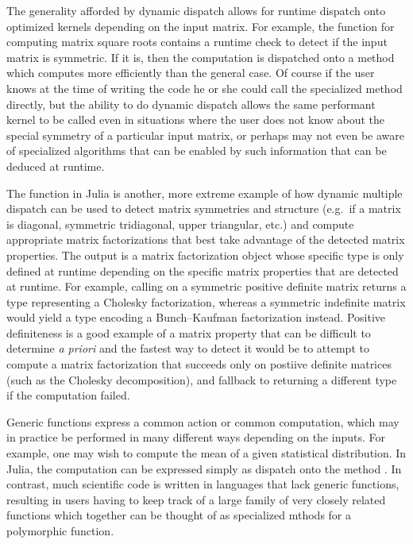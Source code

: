 The generality afforded by dynamic dispatch allows for runtime dispatch onto
optimized kernels depending on the input matrix. For example, the
 function for computing matrix square roots contains a
runtime check to detect if the input matrix is symmetric. If it is, then the
computation is dispatched onto a  method which
computes more efficiently than the general case. Of course if the user knows at
the time of writing the code he or she could call the specialized method
directly, but the ability to do dynamic dispatch allows the same performant
kernel to be called even in situations where the user does not know about the
special symmetry of a particular input matrix, or perhaps may not even be aware
of specialized algorithms that can be enabled by such information that can be
deduced at runtime.

The  function in Julia is another, more extreme example of how
dynamic multiple dispatch can be used to detect matrix symmetries and structure
(e.g.\ if a matrix is diagonal, symmetric tridiagonal, upper triangular, etc.)
and compute appropriate matrix factorizations that best take advantage of the
detected matrix properties. The output is a matrix factorization object whose
specific type is only defined at runtime depending on the specific matrix
properties that are detected at runtime. For example, calling 
on a symmetric positive definite matrix returns a  type
representing a Cholesky factorization, whereas a symmetric indefinite matrix
would yield a  type encoding a Bunch--Kaufman factorization
instead. Positive definiteness is a good example of a matrix property that can
be difficult to determine \textit{a priori} and the fastest way to detect it
would be to attempt to compute a matrix factorization that succeeds only on
postiive definite matrices (such as the Cholesky decomposition), and fallback
to returning a different type if the computation failed.

Generic functions express a common action or common computation, which may in
practice be performed in many different ways depending on the inputs. For
example, one may wish to compute the mean of a given statistical distribution.
In Julia, the computation can be expressed simply as dispatch onto the method
. In contrast, much scientific code is written in
languages that lack generic functions, resulting in users having to keep track
of a large family of very closely related functions which together can be
thought of as specialized mthods for a polymorphic function.

